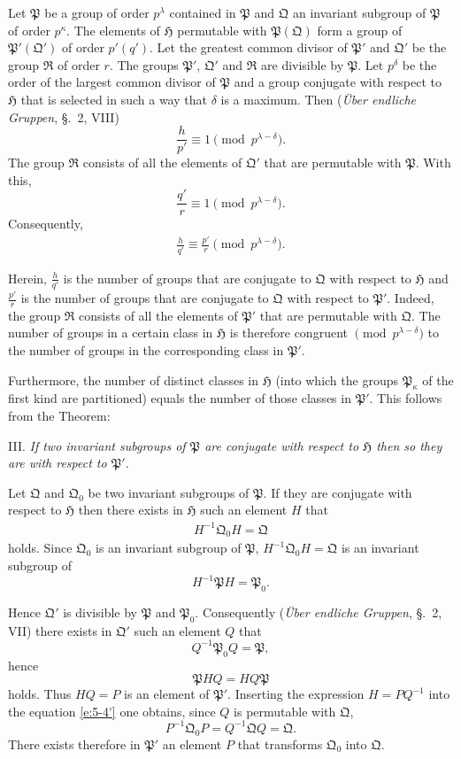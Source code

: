 \documentclass[a5paper,12pt]{article}
\let\fr\mathfrak
\newcommand{\CH}{\fr{H}}
\newcommand{\CP}{\fr{P}}
\newcommand{\CQ}{\fr{Q}}
\newcommand{\CR}{\fr{R}}
\newcommand{\?}{{\color{blue}${}^{(?)}$}}
\newcounter{origpagecounter}{}
\newcommand{\origpagebreak}{\mark{\arabic{origpagecounter}}\addtocounter{origpagecounter}{1}\mark{\arabic{origpagecounter}}}
\begin{document}
Let $\CP$ be a group of order $p^\lambda$ 
contained in $\CP$
and
$\CQ$ an invariant subgroup of $\CP$ of order $p^\kappa$.
%
%
The elements of $\CH$ permutable with $\CP(\CQ)$
form a group of $\CP'(\CQ')$
of order $p'(q')$.
%
%
Let
the greatest common divisor
of $\CP'$ and $\CQ'$
be the group $\CR$ of order $r$.
%
%
The groups 
$\CP'$, $\CQ'$ and $\CR$
are divisible by $\CP$.
%
%
Let $p^\delta$
be the order of 
the largest common divisor 
of $\CP$
and 
a group conjugate
with respect to $\CH$
that is selected
in such a way
that $\delta$ is a maximum.
%
%
Then
(\emph{\"Uber endliche Gruppen}, \S.~2, VIII)
\[
	\frac{h}{p'}
	\equiv
	1
	\pmod{p^{\lambda-\delta}}
	.
\]
%
%
The group $\CR$
consists
of all the elements of $\CQ'$
that are permutable with $\CP$.
%
%
With this,
\[
	\frac{q'}{r} \equiv 1
	\pmod{p^{\lambda-\delta}}
	.
\]
%
%
Consequently,
\begin{align} \label{e:5-7} \tag{7.}
	\frac{h}{q'} \equiv \frac{p'}{r}
	\pmod{p^{\lambda-\delta}}
	.
\end{align}


Herein,
$\frac{h}{q'}$
is the number of groups
that are conjugate to $\CQ$
with respect to $\CH$
and
$\frac{p'}{r}$
is the number of groups
that are conjugate to $\CQ$
with respect to $\CP'$.
%
%
Indeed,
the group $\CR$
consists
of all the elements of $\CP'$
that are permutable with $\CQ$.
%
%
The number of groups
in a certain class in $\CH$
is therefore
congruent $\pmod{p^{\lambda-\delta}}$
to
the number of groups
in the corresponding class in $\CP'$.


Furthermore,
the number of distinct classes in $\CH$
(into which the groups $\CP_\kappa$ of the first kind
are partitioned)
equals
the number of those classes in $\CP'$.
%
%
This follows from the Theorem:


III.
%
\label{t:5-3}
%
\emph{ %
If two invariant subgroups of $\CP$
are conjugate with respect to $\CH$
then 
so they are with respect to $\CP'$.
}


Let $\CQ$ and $\CQ_0$
be two invariant subgroups of $\CP$.
%
%
If they are conjugate with respect to $\CH$
then
there exists in $\CH$
such an element $H$
that
\begin{align} \label{e:5-4'} \tag{4.}
	H^{-1} \CQ_0 H = \CQ
\end{align}
holds.
%
%
Since $\CQ_0$ is an invariant subgroup of $\CP$,
$H^{-1} \CQ_0 H = \CQ$
is an invariant subgroup of 
\[
	H^{-1} \CP H = \CP_0
	.
\]
%
%
\origpagebreak
%
%
Hence
$\CQ'$ is divisible by $\CP$ and $\CP_0$.
%
%
Consequently
(\emph{\"Uber endliche Gruppen}, \S.~2, VII)
there exists in $\CQ'$ 
such an element $Q$
that
\[
	Q^{-1} \CP_0 Q = \CP
	,
\]
hence
\[
	\CP H Q = H Q \CP
\]
holds.
%
%
Thus $H Q = P$
is an element of $\CP'$.
%
%
Inserting the expression $H = P Q^{-1}$
into the equation \eqref{e:5-4'}
one obtains,
since $Q$ is permutable with $\CQ$,
\[
	P^{-1} \CQ_0 P
	=
	Q^{-1} \CQ Q
	=
	\CQ
	.
\]
%
%
There exists therefore
in $\CP'$
an element $P$
that transforms $\CQ_0$ into $\CQ$.
\end{document}
